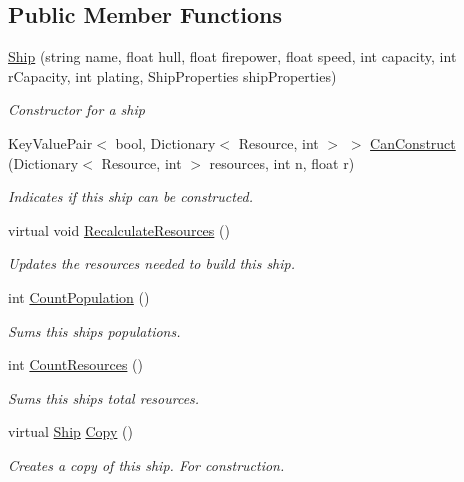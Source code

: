 \subsection*{Public Member Functions}
\begin{DoxyCompactItemize}
\item 
\hyperlink{class_ship_aebcc555eb1057469c19efbcdf85ed5c8}{Ship} (string name, float hull, float firepower, float speed, int capacity, int r\+Capacity, int plating, Ship\+Properties ship\+Properties)
\begin{DoxyCompactList}\small\item\em Constructor for a ship \end{DoxyCompactList}\item 
Key\+Value\+Pair$<$ bool, Dictionary$<$ Resource, int $>$ $>$ \hyperlink{class_ship_a4c61b780123b8a5e3ed5bcf64dedb6e2}{Can\+Construct} (Dictionary$<$ Resource, int $>$ resources, int n, float r)
\begin{DoxyCompactList}\small\item\em Indicates if this ship can be constructed. \end{DoxyCompactList}\item 
virtual void \hyperlink{class_ship_a44022d06a9026eccaa7ce8a499509c74}{Recalculate\+Resources} ()
\begin{DoxyCompactList}\small\item\em Updates the resources needed to build this ship. \end{DoxyCompactList}\item 
int \hyperlink{class_ship_ad7d1051aa85fa6436799a03dcdf25cbc}{Count\+Population} ()
\begin{DoxyCompactList}\small\item\em Sums this ship\textquotesingle{}s populations. \end{DoxyCompactList}\item 
int \hyperlink{class_ship_a566dd165ae8196de2bf89527b1f3fc2f}{Count\+Resources} ()
\begin{DoxyCompactList}\small\item\em Sums this ship\textquotesingle{}s total resources. \end{DoxyCompactList}\item 
virtual \hyperlink{class_ship}{Ship} \hyperlink{class_ship_a64926f0a5ee6d4052d680a453b17d1d9}{Copy} ()
\begin{DoxyCompactList}\small\item\em Creates a copy of this ship. For construction. \end{DoxyCompactList}\end{DoxyCompactItemize}
